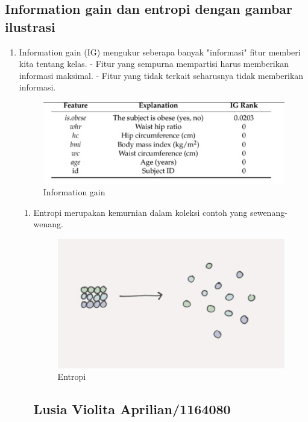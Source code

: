 \begin{enumerate}
\begin{enumerate}
\begin{enumerate}
\begin{enumerate}
\begin{enumerate}
\subsection{Information gain dan entropi dengan gambar ilustrasi}
\begin{enumerate}
\item Information gain (IG) mengukur seberapa banyak "informasi" fitur memberi kita tentang kelas. - Fitur yang sempurna mempartisi harus memberikan informasi maksimal. - Fitur yang tidak terkait seharusnya tidak memberikan informasi.
\begin{figure}[ht]
\centering
\includegraphics[scale=0.5]{figures/f7.jpg}
\caption{Information gain}
\label{contoh}
\end{figure}
\begin{enumerate}
\item Entropi merupakan kemurnian dalam koleksi contoh yang sewenang-wenang.
\begin{figure}[ht]
\centering
\includegraphics[scale=0.5]{figures/f8.jpg}
\caption{Entropi}
\label{contoh}
\end{figure}

\section{Lusia Violita Aprilian/1164080}

\end{enumerate}
\end{enumerate}
\end{enumerate}
\end{enumerate}
\end{enumerate}
\end{enumerate}
\end{enumerate}
